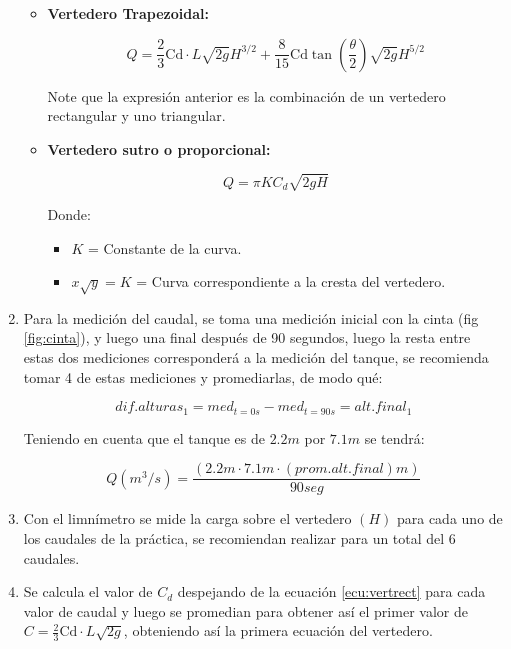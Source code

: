 \documentclass[10pt, a4paper]{exam}
\begin{document}
\begin{enumerate}
\begin{itemize}
        \item \textbf{Vertedero Trapezoidal:} 

        \begin{equation}
            Q = \frac{2}{3} \text{Cd} \cdot L \sqrt{2g} H^{3/2} + \frac{8}{15}\text{Cd}  \tan \left(\frac{\theta}{2}\right) \sqrt{2g} H^{5/2}
        \end{equation}

        Note que la expresión anterior es la combinación de un vertedero rectangular y uno triangular.

        \item \textbf{Vertedero sutro o proporcional:} 

        \begin{equation}
           Q = \pi K C_d\sqrt{2gH}
        \end{equation}

        Donde:  

        \begin{itemize}
            \item $K$ = Constante de la curva.
            \item $x\sqrt{y}=K$ = Curva correspondiente a la cresta del vertedero.
        \end{itemize}


    \end{itemize}

    \item Para la medición del caudal, se toma una medición inicial con la cinta (fig \ref{fig:cinta}), y luego una final después de 90 segundos, luego la resta entre estas dos mediciones corresponderá a la medición del tanque, se recomienda tomar 4 de estas mediciones y promediarlas, de modo qué:

    $$dif.alturas_1=med_{t=0s}-med_{t=90s}=alt.final_{1}$$

    Teniendo en cuenta que el tanque es de $2.2m$ por $7.1m$ se tendrá:

    $$Q (m^3/s)=\dfrac{(2.2m\cdot 7.1m \cdot (prom.alt.final) m)}{90seg}$$

    \item Con el limnímetro se mide la carga sobre el vertedero $(H)$ para cada uno de los caudales de la práctica, se recomiendan realizar para un total del 6 caudales.

    \item Se calcula el valor de $C_d$ despejando de la ecuación \ref{ecu:vertrect} para cada valor de caudal y luego se promedian para obtener así el primer valor de $C=\frac{2}{3} \text{Cd} \cdot L \sqrt{2g}$, obteniendo así la primera ecuación del vertedero.


\end{enumerate}
\end{document}
